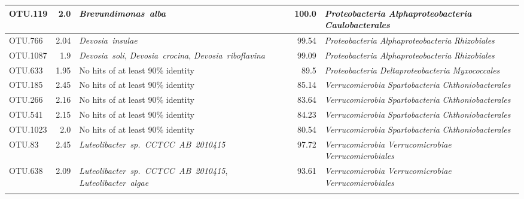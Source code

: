 \documentclass[10pt]{article}
\begin{document}
\begin{longtable}{lrP{5cm}rP{7cm}}
OTU.119 & 2.0 & \mbox{\textit{Brevundimonas alba}} & 100.0 & \mbox{\textit{Proteobacteria}} \mbox{\textit{Alphaproteobacteria}} \mbox{\textit{Caulobacterales}} \\ \midrule
OTU.766 & 2.04 & \mbox{\textit{Devosia insulae}} & 99.54 & \mbox{\textit{Proteobacteria}} \mbox{\textit{Alphaproteobacteria}} \mbox{\textit{Rhizobiales}} \\ \midrule
OTU.1087 & 1.9 & \mbox{\textit{Devosia soli}}, \mbox{\textit{Devosia crocina}}, \mbox{\textit{Devosia riboflavina}} & 99.09 & \mbox{\textit{Proteobacteria}} \mbox{\textit{Alphaproteobacteria}} \mbox{\textit{Rhizobiales}} \\ \midrule
OTU.633 & 1.95 & {No hits of at least 90\% identity} & 89.5 & \mbox{\textit{Proteobacteria}} \mbox{\textit{Deltaproteobacteria}} \mbox{\textit{Myxococcales}} \\ \midrule
OTU.185 & 2.45 & {No hits of at least 90\% identity} & 85.14 & \mbox{\textit{Verrucomicrobia}} \mbox{\textit{Spartobacteria}} \mbox{\textit{Chthoniobacterales}} \\ \midrule
OTU.266 & 2.16 & {No hits of at least 90\% identity} & 83.64 & \mbox{\textit{Verrucomicrobia}} \mbox{\textit{Spartobacteria}} \mbox{\textit{Chthoniobacterales}} \\ \midrule
OTU.541 & 2.15 & {No hits of at least 90\% identity} & 84.23 & \mbox{\textit{Verrucomicrobia}} \mbox{\textit{Spartobacteria}} \mbox{\textit{Chthoniobacterales}} \\ \midrule
OTU.1023 & 2.0 & {No hits of at least 90\% identity} & 80.54 & \mbox{\textit{Verrucomicrobia}} \mbox{\textit{Spartobacteria}} \mbox{\textit{Chthoniobacterales}} \\ \midrule
OTU.83 & 2.45 & \mbox{\textit{Luteolibacter sp. CCTCC AB 2010415}} & 97.72 & \mbox{\textit{Verrucomicrobia}} \mbox{\textit{Verrucomicrobiae}} \mbox{\textit{Verrucomicrobiales}} \\ \midrule
OTU.638 & 2.09 & \mbox{\textit{Luteolibacter sp. CCTCC AB 2010415}}, \mbox{\textit{Luteolibacter algae}} & 93.61 & \mbox{\textit{Verrucomicrobia}} \mbox{\textit{Verrucomicrobiae}} \mbox{\textit{Verrucomicrobiales}} \\ \midrule

\bottomrule
\label{tab:cell}
\end{longtable}
 
\end{document}
